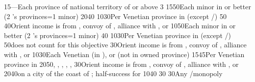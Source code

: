 {15}{---}{Each province of national territory of  or
   above 3}%
%
%
%
%
{15}{50}{Each minor in \EG or better (2 's provinces=1 minor)}%
%
{20}{40}{}%
%
{10}{30}{Per Venetian province in \regionBalkans (except
  \provinceHellas/\provinceMoreas)}%
%
{}{50}{}%
%
{}{40}{Orient income is from , convoy of \villeIzmir,
  alliance with \paysaden, \paysoman or \paysgujarat}%
%
%
%
{10}{50}{Each minor in \EG or better (2 's provinces=1 minor)}%
\EUobjective{}{\provinceMoreas}{}%
{}{40}{}%
%
{10}{30}{Per Venetian province in \regionBalkans (except
  \provinceHellas/\provinceMoreas)}%
%
{}{50}{\provinceRhodos does not count for this objective}%
%
{}{30}{Orient income is from , convoy of \villeIzmir,
  alliance with \paysaden, \paysoman or \paysgujarat}%
%
%
%
%
{10}{30}{Each Venetian \Presidio (in ), or \regionBalkans
  (not in owned province)}%
%
{15}{45}{Per Venetian province in \regionBalkans}%
%
{20}{50}{\provinceChypre, \provinceKreta, \provinceCyclades, \provinceCorfu,
  \provinceMalta, \provinceRhodos}%
%
{}{30}{Orient income is from , convoy of \villeIzmir,
  alliance with \paysaden, \paysoman or \paysgujarat}%
%
%
%
%
{20}{40}{\COL on a city of the coast of \continentIndia; half-success for
  \granderegionCeylan}%
%
{10}{40}{}%
%
{}{30}{}%
%
{}{30}{Any \CTZ/\STZ monopoly}%
